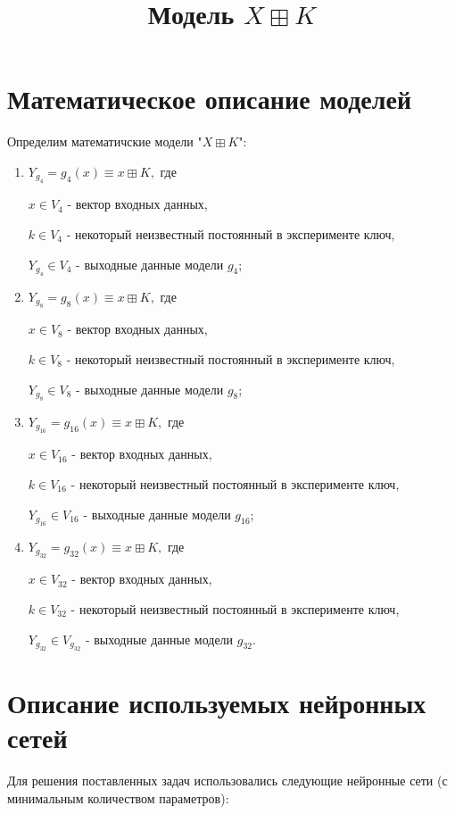 \documentclass[a4paper,12pt,twoside]{article}
\begin{document}
	\title{Модель $X \boxplus K$}
	\maketitle
	
	\section{ Математическое описание моделей}
	
	Определим математичские модели "$X \boxplus K$":
	
	\begin{enumerate}
	\item 
	$Y_{g_4} = g_4(x) \equiv x \boxplus K,$ где
	
	$x \in V_{4}$ - вектор входных данных,
	
	$k \in V_{4}$ - некоторый неизвестный постоянный в эксперименте ключ,
	
	$Y_{g_4} \in V_{4}$ - выходные данные модели $g_4$;
	\bigskip
		
	\item 
	$Y_{g_8} = g_8(x) \equiv x \boxplus K,$ где
	
	$x \in V_{8}$ - вектор входных данных,
	
	$k \in V_{8}$ - некоторый неизвестный постоянный в эксперименте ключ,
	
	$Y_{g_8} \in V_{8}$ - выходные данные модели $g_8$;
	\bigskip
	
		\item 
	$Y_{g_{16}} = g_{16}(x) \equiv x \boxplus K,$ где
	
	$x \in V_{16}$ - вектор входных данных,
	
	$k \in V_{16}$ - некоторый неизвестный постоянный в эксперименте ключ,
	
	$Y_{g_{16}} \in V_{16}$ - выходные данные модели $g_{16}$;
	\bigskip
	
	\item 
	$Y_{g_{32}} = g_{32}(x) \equiv x \boxplus K,$ где
	
	$x \in V_{32}$ - вектор входных данных,
	
	$k \in V_{32}$ - некоторый неизвестный постоянный в эксперименте ключ,
	
	$Y_{g_{32}} \in V_{g_{32}}$ - выходные данные модели $g_{32}$.
	\bigskip

	\end{enumerate}

	
	\newpage
	\section{Описание используемых нейронных сетей}	
	\bigskip
	\noindent Для решения поставленных задач использовались следующие нейронные сети (с минимальным количеством параметров):
	
\end{document}
